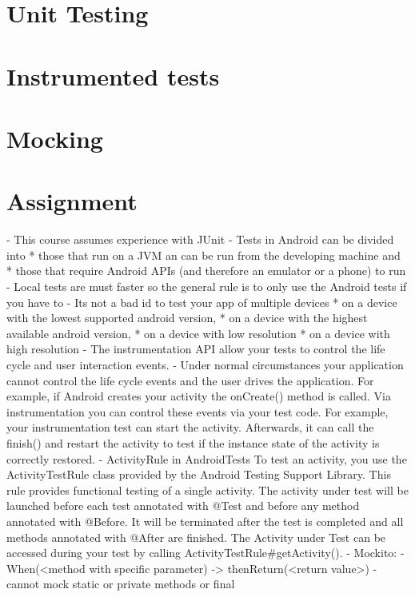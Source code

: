 \graphicspath{{./lab06/Images/}}


\maketocpage

\section{Unit Testing}
\section{Instrumented tests}
\section{Mocking}
\section{Assignment}



- This course assumes experience with JUnit
- Tests in Android can be divided into 
	* those that run on a JVM an can be run from the developing machine and
	* those that require Android APIs (and therefore an emulator or a phone) to run
- Local tests are must faster so the general rule is to only use the Android tests if you have to
- Its not a bad id to test your app of multiple devices
	* on a device with the lowest supported android version,
	* on a device with the highest available android version,
	* on a device with low resolution
	* on a device with high resolution
- The instrumentation API allow your tests to control the life cycle and user interaction events.
- Under normal circumstances your application cannot control the life cycle events and the user drives the application. For example, if Android creates your activity the onCreate() method is called. Via instrumentation you can control these events via your test code. For example, your instrumentation test can start the activity. Afterwards, it can call the finish() and restart the activity to test if the instance state of the activity is correctly restored.
- ActivityRule in AndroidTests
	To test an activity, you use the ActivityTestRule class provided by the Android Testing Support Library. This rule provides functional testing of a single activity. The activity under test will be launched before each test annotated with @Test and before any method annotated with @Before. It will be terminated after the test is completed and all methods annotated with @After are finished. The Activity under Test can be accessed during your test by calling ActivityTestRule#getActivity().
- Mockito:
	- When(<method with specific parameter) -> thenReturn(<return value>)
	- cannot mock static or private methods or final
